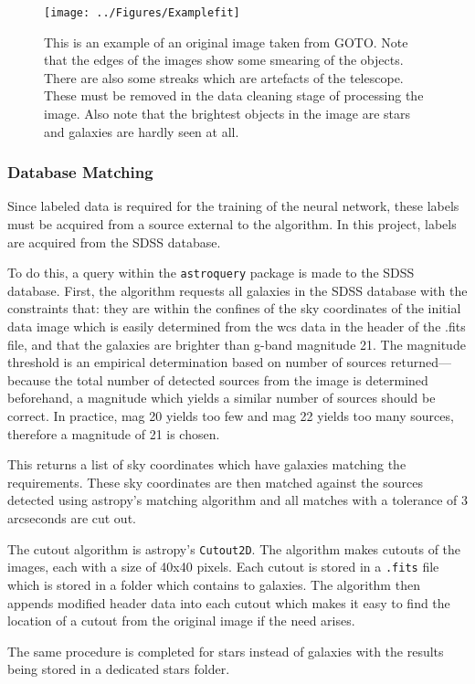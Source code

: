 \documentclass[a4paper,fleqn,usenatbib]{mnras}
\begin{document}
\begin{figure}
\texttt{[image: ../Figures/Examplefit]}
\caption{This is an example of an original image taken from GOTO. Note that the edges of the images show some smearing of the objects. There are also some streaks which are artefacts of the telescope. These must be removed in the data cleaning stage of processing the image. Also note that the brightest objects in the image are stars and galaxies are hardly seen at all. \label{fig:Examplefit}}
\end{figure}

\subsubsection{Database Matching}
Since labeled data is required for the training of the neural network, these labels must be acquired from a source external to the algorithm. In this project, labels are acquired from the SDSS database. 

To do this, a query within the \texttt{astroquery} package is made to the SDSS database. First, the algorithm requests all galaxies in the SDSS database with the constraints that: they are within the confines of the sky coordinates of the initial data image which is easily determined from the wcs data in the header of the .fits file, and that the galaxies are brighter than g-band magnitude 21. The magnitude threshold is an empirical determination based on number of sources returned---because the total number of detected sources from the image is determined beforehand, a magnitude which yields a similar number of sources should be correct. In practice, mag 20 yields too few and mag 22 yields too many sources, therefore a magnitude of 21 is chosen. 

This returns a list of sky coordinates which have galaxies matching the requirements. These sky coordinates are then matched against the sources detected using astropy's matching algorithm and all matches with a tolerance of 3 arcseconds are cut out. 

The cutout algorithm is astropy's \texttt{Cutout2D}. The algorithm makes cutouts of the images, each with a size of 40x40 pixels. Each cutout is stored in a \texttt{.fits} file which is stored in a folder which contains to galaxies. The algorithm then appends modified header data into each cutout which makes it easy to find the location of a cutout from the original image if the need arises. 

The same procedure is completed for stars instead of galaxies with the results being stored in a dedicated stars folder. 
\end{document}

